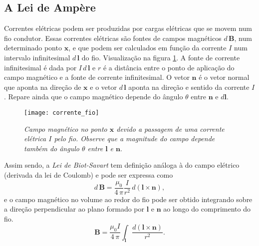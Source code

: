\subsection{A Lei de Ampère}
Correntes elétricas podem ser produzidas por cargas elétricas que se movem num fio condutor. Essas correntes elétricas são fontes de campos magnéticos $d\,\textbf{B}$, num determinado ponto $\mathbf{x}$, e que podem ser calculados em função da corrente $I$ num intervalo infinitesimal $d\,\textbf{l}$ do fio. Visualização na figura \ref{fig.corrente_fio}. A fonte de corrente infinitesimal é dada por $I\,d\,\textbf{l}$ e $r$ é a distância entre o ponto de aplicação do campo magnético e a fonte de corrente infinitesimal. O vetor $\textbf{n}$ é o vetor normal que aponta na direção de $\mathbf{x}$ e o vetor $d\,\textbf{l}$ aponta na direção e sentido da corrente $I$. Repare ainda que o campo magnético depende do ângulo $\theta$ entre $\mathbf{n}$ e $d\mathbf{l}$.
\begin{figure}
\centering
\texttt{[image: corrente\_fio]}
\caption{\textit{Campo magnético no ponto $\mathbf{x}$ devido a passagem de uma corrente elétrica $I$ pelo fio. Observe que a magnitude do campo depende também do ângulo $\theta$ entre $\textbf{l}$ e $\textbf{n}$}.}
\label{fig.corrente_fio}
\end{figure}
Assim sendo, a \textit{Lei de Biot-Savart} tem definição análoga à do campo elétrico (derivada da lei de Coulomb) e pode ser expressa como
\begin{equation}\label{eq.lei_biot_savart}
d\,\textbf{B}=\frac{\mu_0}{4\,\pi}\frac{I}{r^2}\,d(\textbf{l}\times\textbf{n}),
\end{equation}
e o campo magnético no volume ao redor do fio pode ser obtido integrando sobre a direção perpendicular ao plano formado por $\textbf{l}$ e $\textbf{n}$ ao longo do comprimento do fio.
\begin{equation}
\textbf{B}=\frac{\mu_0I}{4\,\pi}\int_{\textbf{l}}\frac{d(\textbf{l}\times\textbf{n})}{r^2}.
\end{equation}

